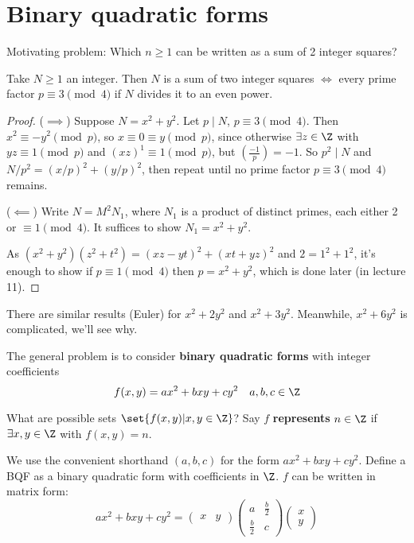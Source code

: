 \documentclass{article}
\newcommand{\legendre}[2]{\genfrac{(}{)}{}{}{#1}{#2}}
\begin{document}

\clearpage

\section{Binary quadratic forms}
Motivating problem: Which $n \geq 1$ can be written as a sum of 2 integer squares?

\begin{nthm}\label{thm:4.1}
    Take $N \geq 1$ an integer.
    Then $N$ is a sum of two integer squares $\iff$ every prime factor $p \equiv 3 \pmod{4}$ if $N$ divides it to an even power.
\end{nthm}

\begin{proof}
    ($\implies$) Suppose $N = x^2 + y^2$. Let $p \mid N$, $p \equiv 3 \pmod{4}$.
    Then $x^2 \equiv -y^2 \pmod{p}$, so $x \equiv 0 \equiv y \pmod{p}$, since otherwise $\exists z \in \Z$ with $y z \equiv 1 \pmod{p}$ and $(xz)^1 \equiv 1 \pmod{p}$, but $\legendre{-1}{p} = -1$.
    So $p^2 \mid N$ and $N/p^2 = (x / p)^2 + (y / p)^2$, then repeat until no prime factor $p \equiv 3 \pmod{4}$ remains.

    ($\impliedby$) Write $N = M^2 N_1$, where $N_1$ is a product of distinct primes, each either 2 or $\equiv1 \pmod{4}$.
    It suffices to show $N_1 = x^2 + y^2$.

    As $(x^2 + y^2)(z^2 + t^2) = (xz - yt)^2 + (xt + yz)^2$ and $2 = 1^2 + 1^2$, it's enough to show if $p \equiv 1 \pmod{4}$ then $p = x^2 + y^2$, which is done later (in lecture 11).
\end{proof}

There are similar results (Euler) for $x^2 + 2y^2$ and $x^2 + 3y^2$.  Meanwhile, $x^2 + 6y^2$ is complicated, we'll see why.

The general problem is to consider \textbf{binary quadratic forms} with integer coefficients
\begin{equation*}
    f(x, y) = a x^2 + b x y + c y^2 \quad a,b,c \in \Z
\end{equation*}

What are possible sets $\set{f(x, y) | x, y \in \Z}$?
Say $f$ \textbf{represents} $n \in \Z$ if $\exists x, y \in \Z$ with $f(x, y) = n$.

We use the convenient shorthand $(a,b,c)$ for the form $a x^2 + b x y + c y^2$.
Define a BQF as a binary quadratic form with coefficients in $\Z$.
$f$ can be written in matrix form:
\begin{equation*}
    a x^2 + b x y + c y^2 =
    \begin{pmatrix}
        x & y
    \end{pmatrix}
    \begin{pmatrix}
        a & \frac{b}{2} \\
        \frac{b}{2} & c
    \end{pmatrix}
    \begin{pmatrix}
        x \\ y
    \end{pmatrix}
\end{equation*}
\end{document}
